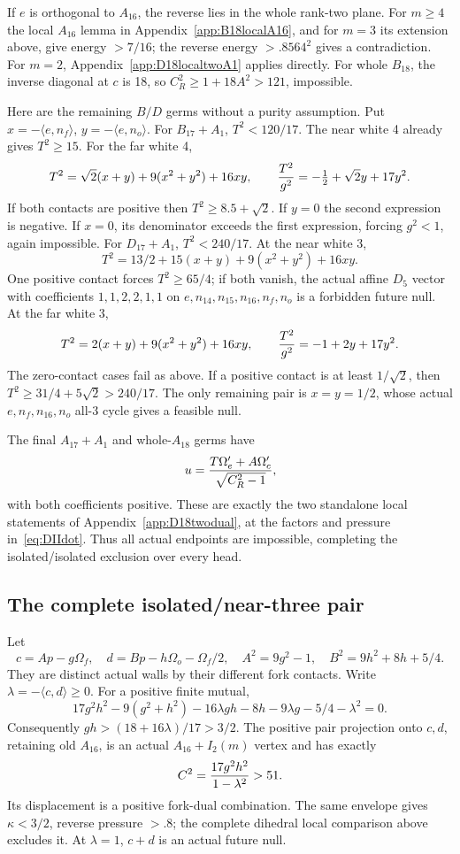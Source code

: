 \documentclass[11pt]{article}
\theoremstyle{definition}
\theoremstyle{remark}
\newcommand{\ip}[2]{\langle #1,#2\rangle}
\begin{document}
If \(e\) is orthogonal to \(A_{16}\), the reverse lies in the whole
rank-two plane.  For \(m\ge4\) the local \(A_{16}\) lemma in
Appendix~\ref{app:B18localA16}, and for \(m=3\) its extension
above, give energy \(>7/16\); the reverse energy
\(>.8564^2\) gives a contradiction.
For \(m=2\), Appendix~\ref{app:D18localtwoA1} applies directly.
For whole \(B_{18}\), the inverse diagonal at \(c\) is 18, so
\(C_R^2\ge1+18A^2>121\), impossible.

Here are the remaining \(B/D\) germs without a purity assumption.
Put \(x=-\ip e{n_f}\), \(y=-\ip e{n_o}\).
For \(B_{17}+A_1\), \(T^2<120/17\).
The near white 4 already gives \(T^2\ge15\).
For the far white 4,
\[
 T^2=\sqrt2(x+y)+9(x^2+y^2)+16xy,\qquad
 {T^2\over g^2}=-\tfrac12+\sqrt2y+17y^2 .
\]
If both contacts are positive then \(T^2\ge8.5+\sqrt2\).
If \(y=0\) the second expression is negative.
If \(x=0\), its denominator exceeds the first expression, forcing
\(g^2<1\), again impossible.
For \(D_{17}+A_1\), \(T^2<240/17\).
At the near white 3,
\[
 T^2=13/2+15(x+y)+9(x^2+y^2)+16xy .
\]
One positive contact forces \(T^2\ge65/4\); if both vanish,
the actual affine \(D_5\) vector with coefficients \(1,1,2,2,1,1\)
on \(e,n_{14},n_{15},n_{16},n_f,n_o\) is a forbidden future null.
At the far white 3,
\[
 T^2=2(x+y)+9(x^2+y^2)+16xy,\qquad
 {T^2\over g^2}=-1+2y+17y^2 .
\]
The zero-contact cases fail as above.
If a positive contact is at least \(1/\sqrt2\), then
\(T^2\ge31/4+5\sqrt2>240/17\).
The only remaining pair is \(x=y=1/2\), whose actual
\(e,n_f,n_{16},n_o\) all-3 cycle gives a feasible null.

The final \(A_{17}+A_1\) and whole-\(A_{18}\) germs have
\[
 u={T\Omega'_e+A\Omega'_c\over\sqrt{C_R^2-1}},
\]
with both coefficients positive.
These are exactly the two standalone local statements of
Appendix~\ref{app:D18twodual}, at the factors and pressure
in~\eqref{eq:DIIdot}.
Thus all actual endpoints are impossible, completing the
isolated/isolated exclusion over every head.

\subsection{The complete isolated/near-three pair}
\label{app:D18isolatednear}

Let
\[
 c=Ap-g\Omega_f,\quad
 d=Bp-h\Omega_o-\Omega_f/2,\quad
 A^2=9g^2-1,\quad B^2=9h^2+8h+5/4 .
\]
They are distinct actual walls by their different fork contacts.
Write \(\lambda=-\ip cd\ge0\).
For a positive finite mutual,
\[
 17g^2h^2-9(g^2+h^2)-16\lambda gh
       -8h-9\lambda g-5/4-\lambda^2=0.
\]
Consequently \(gh>(18+16\lambda)/17>3/2\).
The positive pair projection onto \(c,d\), retaining old \(A_{16}\),
is an actual \(A_{16}+I_2(m)\) vertex and has exactly
\[
                  C^2={17g^2h^2\over1-\lambda^2}>51.
\]
Its displacement is a positive fork-dual combination.
The same envelope gives \(\kappa<3/2\), reverse pressure \(>.8\);
the complete dihedral local comparison above excludes it.
At \(\lambda=1\), \(c+d\) is an actual future null.
\end{document}
